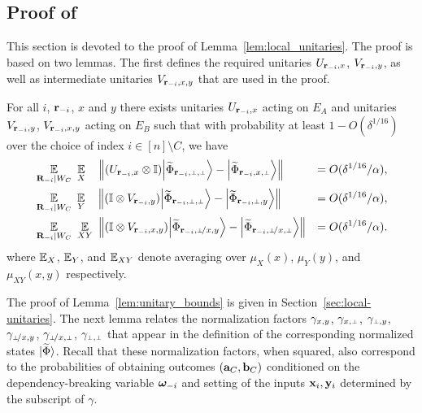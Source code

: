 \subsection{Proof of }
\label{sec:anchorpr_main_lemma}

This section is devoted to the proof of Lemma~\ref{lem:local_unitaries}. The proof is based on two lemmas. The first defines the required unitaries $U_{\mathbf{r}_{-i},x}$, $V_{\mathbf{r}_{-i},y}$, as well as intermediate unitaries $V_{\mathbf{r}_{-i},x,y}$ that are used in the proof. %

\begin{lemma}
\label{lem:unitary_bounds}
For all $i$, $\mathbf{r}_{-i}$, $x$ and $y$ there exists unitaries $U_{\mathbf{r}_{-i}, x}$ acting on $E_A$ and unitaries $V_{\mathbf{r}_{-i}, y}$, $V_{{\mathbf{r}_{-i} , x,y}}$ acting on $E_B$ such that with probability at least $1 - O(\delta^{1/16})$ over the choice of index $i \in [n] \setminus C$, we have
\begin{align}
	&\Ex_{\bR_\mi | W_C} \,\, \Ex_X \,\,\,\, \, \, \left \|(U_{\br_\mi, x} \otimes \Id)  \bigket{\wt{\Phi}_\sspp} - \bigket{\wt{\Phi}_\ssxp }   \right \| &=  O(\delta^{1/16}/\alpha),\label{eq:ux_bound}\\
	&\Ex_{\bR_\mi | W_C} \,\, \Ex_Y \,\, \,\, \, \, \left \| (\Id \otimes V_{\br_\mi,y})  \bigket{\wt{\Phi}_\sspp}  - \bigket{\wt{\Phi}_\sspy }  \right \| &=  O(\delta^{1/16}/\alpha),\label{eq:vy_bound}\\
	&\Ex_{\bR_\mi | W_C} \,\, \Ex_{XY} \,\,  \left \|  (\Id \otimes V_{\ssxy})  \bigket{\wt{\Phi}_\sspxy}  - \bigket{\wt{\Phi}_\sspxp }  \right \| &=  O(\delta^{1/16}/\alpha).\label{eq:vxy_bound}
		\end{align}
		where $\operatorname*{\mathbb{E}}_X$, $\operatorname*{\mathbb{E}}_Y$, and $\operatorname*{\mathbb{E}}_{XY}$ denote averaging over $\mu_X(x)$, $\mu_Y(y)$, and $\mu_{XY}(x,y)$ respectively.
\end{lemma}

The proof of Lemma~\ref{lem:unitary_bounds} is given in Section~\ref{sec:local-unitaries}.
The next lemma relates the normalization factors $\gamma_{x,y}$, $\gamma_{\xp}$, $\gamma_{\py}$, $\gamma_{\pxy}$, $\gamma_{\pxp}$, $\gamma_{\pp}$ that appear in the definition of the corresponding normalized states ${|\widetilde{\Phi}\rangle}$. Recall that these normalization factors, when squared, also correspond to the probabilities of obtaining outcomes $(\mathbf{a}_C,\mathbf{b}_C)$ conditioned on the dependency-breaking variable ${\boldsymbol{\omega}}_{-i}$ and setting of the inputs $\mathbf{x}_i,\mathbf{y}_i$ determined by the subscript of $\gamma$.

